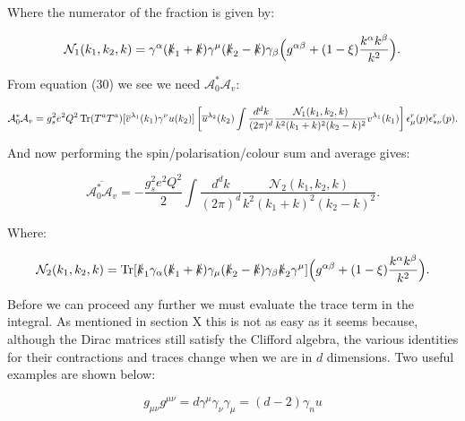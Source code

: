 	Where the numerator of the fraction is given by:

	\begin{equation}
	\mathcal{N}_1(k_1, k_2, k) = \gamma^\alpha(\slashed k_1 + \slashed k)\gamma^\mu(\slashed k_2 - \slashed k)\gamma_\beta\Big(g^{\alpha\beta} + (1-\xi)\frac{k^\alpha k^\beta}{k^2}\Big).
	\end{equation}

	From equation (30) we see we need $\mathcal{A}_0^*\mathcal{A}_v$:

	\begin{equation}
	\mathcal{A}_0^*\mathcal{A}_v = g_s^2e^2Q^2\operatorname{Tr}(T^aT^a)[\overline{v}^{\lambda_1}(k_1)\gamma^\nu u(k_2)]\left[\overline{u}^{\lambda_2}(k_2)\int\frac{d^{d}k}{(2\pi)^{d}}\frac{\mathcal{N}_1(k_1, k_2, k)}{k^2(k_1+k)^2(k_2-k)^2}v^{\lambda_1}(k_1)\right]	\epsilon^r_{\mu}(p)\epsilon^r_{*\nu}(p).
	\end{equation}

	And now performing the spin/polarisation/colour sum and average gives:

	\begin{equation}
	\overline{\mathcal{A}_0^*\mathcal{A}_v} = -\frac{g_s^2e^2Q^2}{2}\int\frac{d^{d}k}{(2\pi)^{d}}\frac{\mathcal{N}_2(k_1, k_2,k)}{k^2(k_1+k)^2(k_2-k)^2}.
	\end{equation}

	Where:

	\begin{equation}
	\mathcal{N}_2(k_1, k_2, k) = \operatorname{Tr}[\slashed k_1 \gamma_\alpha(\slashed k_1 + \slashed k)\gamma_\mu(\slashed k_2 - \slashed k)\gamma_\beta\slashed k_2\gamma^\mu]\Big(g^{\alpha\beta} + (1-\xi)\frac{k^\alpha k^\beta}{k^2}\Big).
	\end{equation}

	Before we can proceed any further we must evaluate the trace term in the integral.  As mentioned in section X
	this is not as easy as it seems because, although the Dirac matrices still satisfy the Clifford algebra, the
	various identities for their contractions and traces change when we are in $d$ dimensions.  Two useful examples are shown below:

	\begin{subequations}
	\begin{equation}
	g_{\mu\nu}g^{\mu\nu} = d
	\end{equation}
	\begin{equation}
	\gamma^\mu\gamma_\nu\gamma_\mu = (d-2)\gamma_nu
	\end{equation}
	\end{subequations}

